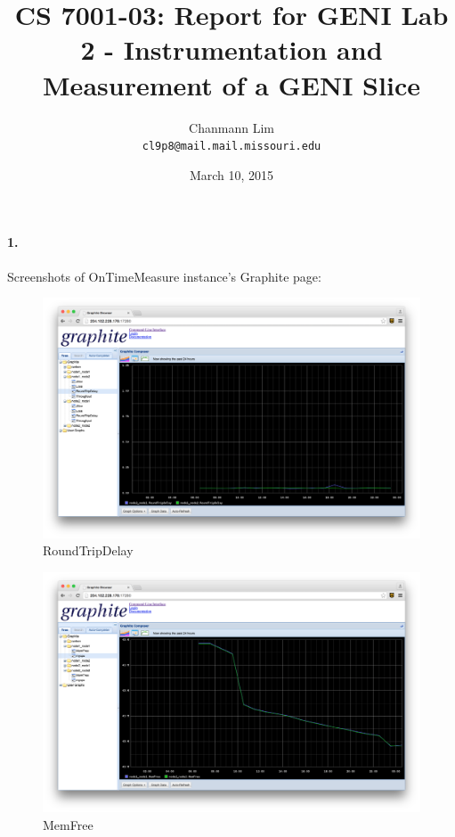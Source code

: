 \documentclass[a4paper]{article}
\begin{document}
\title{CS 7001-03: Report for GENI Lab 2 - Instrumentation and Measurement of a GENI Slice}
\author{Chanmann Lim\\ 
	\texttt{cl9p8@mail.mail.missouri.edu}}
\date{March 10, 2015}
\maketitle

\paragraph{1. } Screenshots of OnTimeMeasure instance's Graphite page:
\begin{figure}[H]
  \centering
    \includegraphics[scale=.32]{round_trip_delay.png}
  \caption{RoundTripDelay}
\end{figure}
\begin{figure}[H]
  \centering
    \includegraphics[scale=.32]{memfree.png}
  \caption{MemFree}
\end{figure}
\end{document}
